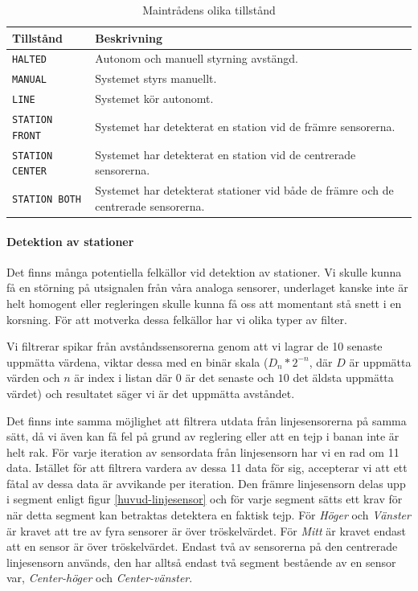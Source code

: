 \begin{table}[h!]
	\centering
	\begin{tabularx}{\textwidth}{| l | X |}
		\hline
		{\textbf{Tillstånd}} & {\textbf{Beskrivning}} \\\hline
		{\texttt{HALTED}} & {Autonom och manuell styrning avstängd.} \\\hline
		{\texttt{MANUAL}} & {Systemet styrs manuellt.} \\\hline
		{\texttt{LINE}} & {Systemet kör autonomt.} \\\hline
		{\texttt{STATION FRONT}} & {Systemet har detekterat en station vid de främre sensorerna.} \\\hline
		{\texttt{STATION CENTER}} & {Systemet har detekterat en station vid de centrerade sensorerna.} \\\hline
		{\texttt{STATION BOTH}} & {Systemet har detekterat stationer vid både de främre och de centrerade sensorerna.} \\\hline
	\end{tabularx}
	\caption{Maintrådens olika tillstånd} \label{huvud-tillstand}
\end{table}

\paragraph{Detektion av stationer}

Det finns många potentiella felkällor vid detektion av stationer. Vi skulle kunna få en störning på utsignalen från våra analoga sensorer, underlaget kanske inte är helt homogent eller regleringen skulle kunna få oss att momentant stå snett i en korsning. För att motverka dessa felkällor har vi olika typer av filter.

Vi filtrerar spikar från avståndssensorerna genom att vi lagrar de 10 senaste uppmätta värdena, viktar dessa med en binär skala ($D_{n}*2^{-n}$, där $D$ är uppmätta värden och $n$ är index i listan där $0$ är det senaste och $10$ det äldsta uppmätta värdet) och resultatet säger vi är det uppmätta avståndet.

Det finns inte samma möjlighet att filtrera utdata från linjesensorerna på samma sätt, då vi även kan få fel på grund av reglering eller att en tejp i banan inte är helt rak. För varje iteration av sensordata från linjesensorn har vi en rad om 11 data. Istället för att filtrera vardera av dessa 11 data för sig, accepterar vi att ett fåtal av dessa data är avvikande per iteration. Den främre linjesensorn delas upp i segment enligt figur \ref{huvud-linjesensor} och för varje segment sätts ett krav för när detta segment kan betraktas detektera en faktisk tejp. För \textit{Höger} och \textit{Vänster} är kravet att tre av fyra sensorer är över tröskelvärdet. För \textit{Mitt} är kravet endast att en sensor är över tröskelvärdet. Endast två av sensorerna på den centrerade linjesensorn används, den har alltså endast två segment bestående av en sensor var, \textit{Center-höger} och \textit{Center-vänster}.

